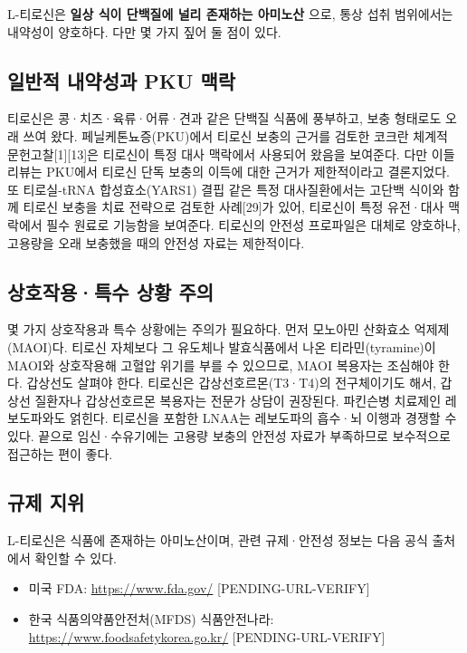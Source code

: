 \documentclass[12pt,oneside]{book}
\begin{document}
L-티로신은 \textbf{일상 식이 단백질에 널리 존재하는 아미노산} 으로, 통상 섭취 범위에서는 내약성이 양호하다. 다만 몇 가지 짚어 둘 점이 있다.

\subsection{일반적 내약성과 PKU 맥락}

티로신은 콩·치즈·육류·어류·견과 같은 단백질 식품에 풍부하고, 보충 형태로도 오래 쓰여 왔다. 페닐케톤뇨증(PKU)에서 티로신 보충의 근거를 검토한 코크란 체계적 문헌고찰[1][13]은 티로신이 특정 대사 맥락에서 사용되어 왔음을 보여준다. 다만 이들 리뷰는 PKU에서 티로신 단독 보충의 이득에 대한 근거가 제한적이라고 결론지었다. 또 티로실-tRNA 합성효소(YARS1) 결핍 같은 특정 대사질환에서는 고단백 식이와 함께 티로신 보충을 치료 전략으로 검토한 사례[29]가 있어, 티로신이 특정 유전·대사 맥락에서 필수 원료로 기능함을 보여준다. 티로신의 안전성 프로파일은 대체로 양호하나, 고용량을 오래 보충했을 때의 안전성 자료는 제한적이다.

\subsection{상호작용·특수 상황 주의}

몇 가지 상호작용과 특수 상황에는 주의가 필요하다. 먼저 모노아민 산화효소 억제제(MAOI)다. 티로신 자체보다 그 유도체나 발효식품에서 나온 티라민(tyramine)이 MAOI와 상호작용해 고혈압 위기를 부를 수 있으므로, MAOI 복용자는 조심해야 한다. 갑상선도 살펴야 한다. 티로신은 갑상선호르몬(T3·T4)의 전구체이기도 해서, 갑상선 질환자나 갑상선호르몬 복용자는 전문가 상담이 권장된다. 파킨슨병 치료제인 레보도파와도 얽힌다. 티로신을 포함한 LNAA는 레보도파의 흡수·뇌 이행과 경쟁할 수 있다. 끝으로 임신·수유기에는 고용량 보충의 안전성 자료가 부족하므로 보수적으로 접근하는 편이 좋다.

\subsection{규제 지위}

L-티로신은 식품에 존재하는 아미노산이며, 관련 규제·안전성 정보는 다음 공식 출처에서 확인할 수 있다.

\begin{itemize}[leftmargin=6mm,itemsep=1pt,topsep=2pt]
  \item 미국 FDA: \url{https://www.fda.gov/} [PENDING-URL-VERIFY]
  \item 한국 식품의약품안전처(MFDS) 식품안전나라: \url{https://www.foodsafetykorea.go.kr/} [PENDING-URL-VERIFY]
\end{itemize}
\end{document}
